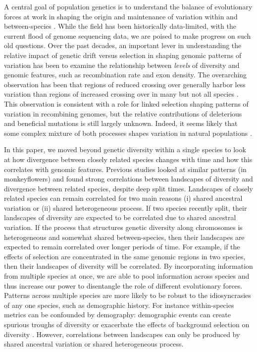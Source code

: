 A central goal of population genetics is to understand the balance of 
evolutionary forces at work in shaping the origin and maintenance of variation 
within and between-species \citep{lewontin_genetic_1974}.
While the field has been historically data-limited, with the current flood of
genome sequencing data, we are poised to make progress on such old questions.
Over the past decades, an important lever in understanding the relative impact
of genetic drift versus selection in shaping genomic patterns of variation has
been to examine the relationship between \textit{levels} of diversity and 
genomic features, such as recombination rate and exon density.
The overarching observation has been that regions of reduced crossing over
generally harbor less variation than regions of increased crossing over in
many but not all species \parencite[\eg][]{begun_levels_1992, corbett-detig_natural_2015}.
This observation is consistent with a role for linked selection
shaping patterns of variation in recombining genomes,
but  the relative contributions of deleterious and
beneficial mutations is still largely unknown.
Indeed, it seems likely that some complex mixture of both processes shapes variation
in natural populations \parencite{kern_neutral_2018}.

In this paper,
we moved beyond genetic diversity within a single species to look at how divergence between closely related species changes with time
and how this correlates with genomic features.
Previous studies \citep[\eg][]{stankowski_widespread_2019} looked at similar patterns (in monkeyflowers)
and found strong correlations
between landscapes of diversity and divergence between related species, despite deep split 
times.
Landscapes of closely related species can remain correlated for two main reasons (i) shared ancestral variation 
or (ii) shared heterogeneous process.
If two species recently split, their landscapes of diversity are 
expected to be correlated due to shared ancestral variation.
If the process that structures genetic diversity along chromosomes is 
heterogeneous and somewhat shared between-species, then their landscapes are
expected to remain correlated over longer periods of time.
For example, if the effects of selection are concentrated in the same genomic 
regions in two species, then their landscapes of diversity will be correlated.
By incorporating information from multiple species at once,
we are able to pool information across species and thus increase our power to disentangle the role of different evolutionary forces.
Patterns across multiple species are more likely to be robust to the idiosyncrasies of any one species,
such as demographic history.
For instance within-species metrics can be confounded by demography:
demographic events can create spurious troughs of diversity \citep{simonsen_properties_1995} or exacerbate the effects of background selection on diversity \citep{torres_human_2018}.
However, correlations between landscapes can only be produced by shared ancestral variation or shared heterogeneous process.


